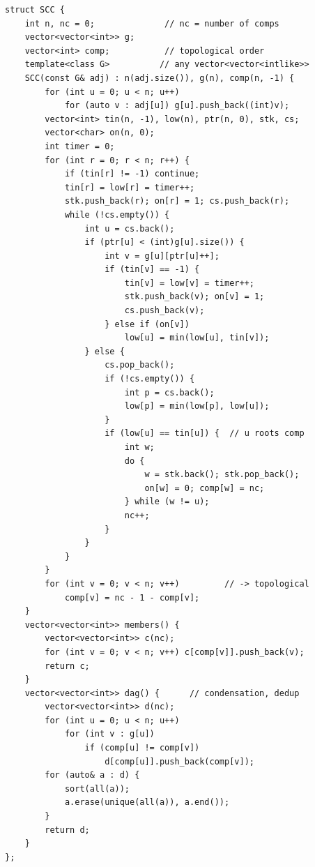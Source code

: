 \begin{lstlisting}
struct SCC {
    int n, nc = 0;              // nc = number of comps
    vector<vector<int>> g;
    vector<int> comp;           // topological order
    template<class G>          // any vector<vector<intlike>>
    SCC(const G& adj) : n(adj.size()), g(n), comp(n, -1) {
        for (int u = 0; u < n; u++)
            for (auto v : adj[u]) g[u].push_back((int)v);
        vector<int> tin(n, -1), low(n), ptr(n, 0), stk, cs;
        vector<char> on(n, 0);
        int timer = 0;
        for (int r = 0; r < n; r++) {
            if (tin[r] != -1) continue;
            tin[r] = low[r] = timer++;
            stk.push_back(r); on[r] = 1; cs.push_back(r);
            while (!cs.empty()) {
                int u = cs.back();
                if (ptr[u] < (int)g[u].size()) {
                    int v = g[u][ptr[u]++];
                    if (tin[v] == -1) {
                        tin[v] = low[v] = timer++;
                        stk.push_back(v); on[v] = 1;
                        cs.push_back(v);
                    } else if (on[v])
                        low[u] = min(low[u], tin[v]);
                } else {
                    cs.pop_back();
                    if (!cs.empty()) {
                        int p = cs.back();
                        low[p] = min(low[p], low[u]);
                    }
                    if (low[u] == tin[u]) {  // u roots comp
                        int w;
                        do {
                            w = stk.back(); stk.pop_back();
                            on[w] = 0; comp[w] = nc;
                        } while (w != u);
                        nc++;
                    }
                }
            }
        }
        for (int v = 0; v < n; v++)         // -> topological
            comp[v] = nc - 1 - comp[v];
    }
    vector<vector<int>> members() {
        vector<vector<int>> c(nc);
        for (int v = 0; v < n; v++) c[comp[v]].push_back(v);
        return c;
    }
    vector<vector<int>> dag() {      // condensation, dedup
        vector<vector<int>> d(nc);
        for (int u = 0; u < n; u++)
            for (int v : g[u])
                if (comp[u] != comp[v])
                    d[comp[u]].push_back(comp[v]);
        for (auto& a : d) {
            sort(all(a));
            a.erase(unique(all(a)), a.end());
        }
        return d;
    }
};
\end{lstlisting}

